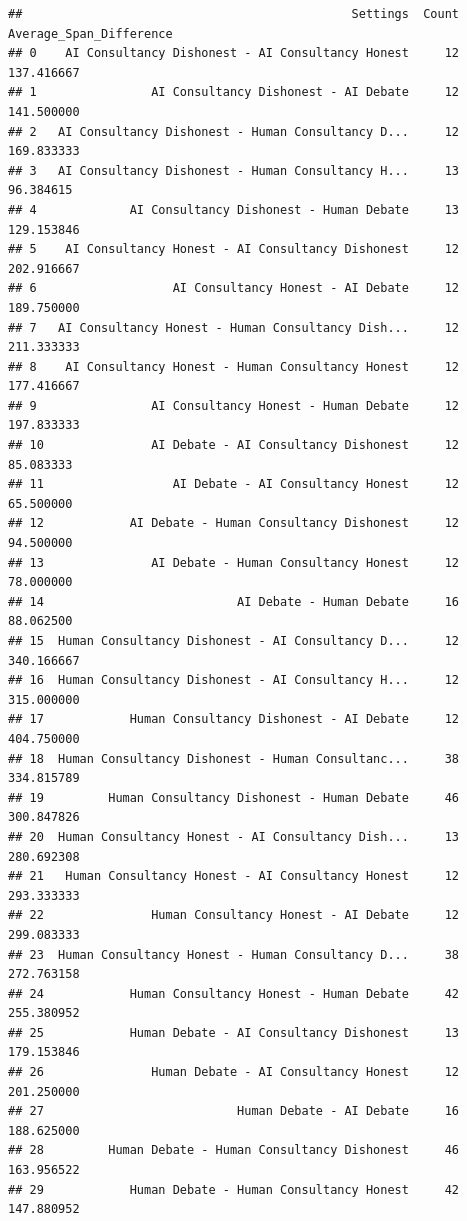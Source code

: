 \documentclass[
]{article}
\begin{document}
\begin{verbatim}
##                                              Settings  Count  Average_Span_Difference
## 0    AI Consultancy Dishonest - AI Consultancy Honest     12               137.416667
## 1                AI Consultancy Dishonest - AI Debate     12               141.500000
## 2   AI Consultancy Dishonest - Human Consultancy D...     12               169.833333
## 3   AI Consultancy Dishonest - Human Consultancy H...     13                96.384615
## 4             AI Consultancy Dishonest - Human Debate     13               129.153846
## 5    AI Consultancy Honest - AI Consultancy Dishonest     12               202.916667
## 6                   AI Consultancy Honest - AI Debate     12               189.750000
## 7   AI Consultancy Honest - Human Consultancy Dish...     12               211.333333
## 8    AI Consultancy Honest - Human Consultancy Honest     12               177.416667
## 9                AI Consultancy Honest - Human Debate     12               197.833333
## 10               AI Debate - AI Consultancy Dishonest     12                85.083333
## 11                  AI Debate - AI Consultancy Honest     12                65.500000
## 12            AI Debate - Human Consultancy Dishonest     12                94.500000
## 13               AI Debate - Human Consultancy Honest     12                78.000000
## 14                           AI Debate - Human Debate     16                88.062500
## 15  Human Consultancy Dishonest - AI Consultancy D...     12               340.166667
## 16  Human Consultancy Dishonest - AI Consultancy H...     12               315.000000
## 17            Human Consultancy Dishonest - AI Debate     12               404.750000
## 18  Human Consultancy Dishonest - Human Consultanc...     38               334.815789
## 19         Human Consultancy Dishonest - Human Debate     46               300.847826
## 20  Human Consultancy Honest - AI Consultancy Dish...     13               280.692308
## 21   Human Consultancy Honest - AI Consultancy Honest     12               293.333333
## 22               Human Consultancy Honest - AI Debate     12               299.083333
## 23  Human Consultancy Honest - Human Consultancy D...     38               272.763158
## 24            Human Consultancy Honest - Human Debate     42               255.380952
## 25            Human Debate - AI Consultancy Dishonest     13               179.153846
## 26               Human Debate - AI Consultancy Honest     12               201.250000
## 27                           Human Debate - AI Debate     16               188.625000
## 28         Human Debate - Human Consultancy Dishonest     46               163.956522
## 29            Human Debate - Human Consultancy Honest     42               147.880952
\end{verbatim}
\end{document}
